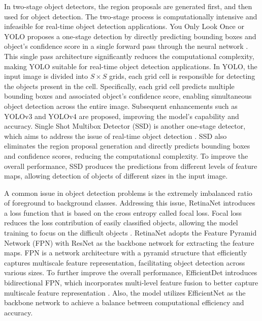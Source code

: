 \documentclass[preprint,12pt]{elsarticle}
\begin{document}
In two-stage object detectors, the region proposals are generated first, and then used for object detection. The two-stage process is computationally intensive and infeasible for real-time object detection applications. You Only Look Once or YOLO proposes a one-stage detection by directly predicting bounding boxes and object’s confidence score in a single forward pass through the neural network \citep{redmon_you_2016}. This single pass architecture significantly reduces the computational complexity, making YOLO suitable for real-time object detection applications. In YOLO, the input image is divided into $S×S$ grids, each grid cell is responsible for detecting the objects present in the cell. Specifically, each grid cell predicts multiple bounding boxes and associated object’s confidence score, enabling simultaneous object detection across the entire image. Subsequent enhancements such as YOLOv3 \citep{redmon_yolov3_2018} and YOLOv4 \citep{bochkovskiy_yolov4_2020} are proposed, improving the model’s capability and accuracy. Single Shot Multibox Detector (SSD) is another one-stage detector, which aims to address the issue of real-time object detection \citep{liu_ssd_2016}. SSD also eliminates the region proposal generation and directly predicts bounding boxes and confidence scores, reducing the computational complexity. To improve the overall performance, SSD produces the predictions from different levels of feature maps, allowing detection of objects of different sizes in the input image. 

A common issue in object detection problems is the extremely imbalanced ratio of foreground to background classes. Addressing this issue, RetinaNet introduces a loss function that is based on the cross entropy called focal loss. Focal loss reduces the loss contribution of easily classified objects, allowing the model training to focus on the difficult objects \citep{lin_focal_2020}. RetinaNet adopts the Feature Pyramid Network (FPN) \citep{lin_feature_2017} with ResNet as the backbone network for extracting the feature maps. FPN is a network architecture with a pyramid structure that efficiently captures multiscale feature representation, facilitating object detection across various sizes. To further improve the overall performance, EfficientDet introduces bidirectional FPN, which incorporates multi-level feature fusion to better capture multiscale feature representation \citep{tan_efficientdet_2020}. Also, the model utilizes EfficientNet \citep{tan_efficientnet_2019} as the backbone network to achieve a balance between computational efficiency and accuracy. 
\end{document}
